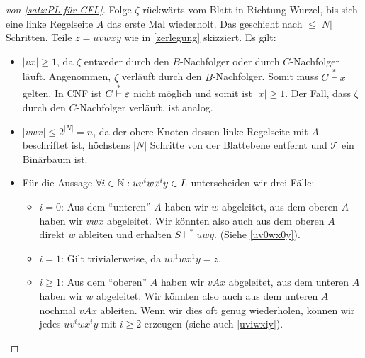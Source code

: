 \begin{proof}[von \autoref{satz:PL für CFL}]
  Folge $\zeta$ rückwärts vom Blatt in Richtung Wurzel, bis sich eine linke Regelseite $A$ das erste Mal wiederholt. 
  Das geschieht nach $\le |N|$ Schritten.
  Teile $z = uvwxy$ wie in \autoref{zerlegung} skizziert. Es gilt:
      \begin{itemize}
      \item $|vx|\geq 1$, da $\zeta$ entweder durch den $B$-Nachfolger oder durch $C$-Nachfolger läuft.
        Angenommen, $\zeta$ verläuft durch den $B$-Nachfolger.
        Somit muss $C \stackrel{*}{\vdash} x$ gelten. In \ac{CNF} ist $C \stackrel{*}{\vdash} \varepsilon$ nicht möglich und somit ist $|x| \ge 1$.
        Der Fall, dass $\zeta$ durch den $C$-Nachfolger verläuft, ist analog.
      \item $|vwx| \le 2^{|N|} = n$, da der obere Knoten dessen linke Regelseite mit $A$ beschriftet ist, höchstens $|N|$ Schritte von der Blattebene entfernt und $\mathcal{T}$ ein Binärbaum ist.
      \item Für die Aussage $\forall i\in\mathbb{N}: uv^iwx^iy\in L$ unterscheiden wir drei Fälle:
      \begin{itemize}
				\item $i=0$: Aus dem "`unteren"' $A$ haben wir $w$ abgeleitet,
				aus dem oberen $A$ haben wir $vwx$ abgeleitet.
				Wir könnten also auch aus dem oberen $A$ direkt $w$ ableiten und erhalten $S\vdash^* uwy$.
				(Siehe \autoref{uv0wx0y}).
				\item $i=1$: Gilt trivialerweise, da $uv^1wx^1y=z$.
				\item $i\geq 1$: Aus dem "`oberen"' $A$ haben wir $vAx$ abgeleitet,
				aus dem unteren $A$ haben wir $w$ abgeleitet.
				Wir könnten also auch aus dem unteren $A$ nochmal $vAx$ ableiten.
				Wenn wir dies oft genug wiederholen, können wir jedes $uv^iwx^iy$ mit $i\geq 2$ erzeugen
				(siehe auch \autoref{uviwxiy}).
				
      \end{itemize}

      \end{itemize}
		\begin{figure}[H]\centering
		\begin{subfigure}[b]{.35\linewidth}\centering
\end{subfigure}
\end{figure}
\end{proof}
